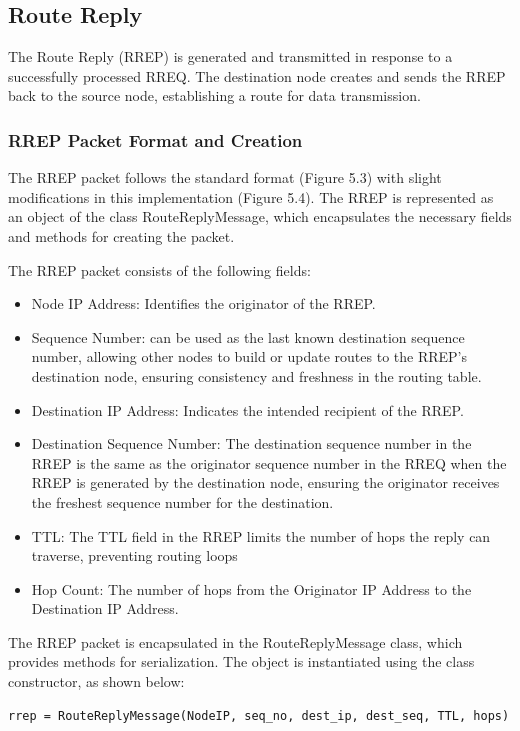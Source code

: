 \documentclass[]{nsm-thesis}
\begin{document}
\subsection{Route Reply}
The Route Reply (RREP) is generated and transmitted in response to a successfully processed RREQ. The destination node creates and sends the RREP back to the source node, establishing a route for data transmission.
\subsubsection{RREP Packet Format and Creation}
The RREP packet follows the standard format (Figure 5.3) with slight modifications in this implementation (Figure 5.4). The RREP is represented as an object of the class RouteReplyMessage, which encapsulates the necessary fields and methods for creating the packet.

The RREP packet consists of the following fields:
\begin{itemize}
    \item Node IP Address: Identifies the originator of the RREP.
    \item Sequence Number: can be used as the last known destination sequence number, allowing other nodes to build or update routes to the RREP's destination node, ensuring consistency and freshness in the routing table.
    \item Destination IP Address: Indicates the intended recipient of the RREP.
    \item Destination Sequence Number: The destination sequence number in the RREP is the same as the originator sequence number in the RREQ when the RREP is generated by the destination node, ensuring the originator receives the freshest sequence number for the destination.
    \item TTL: The TTL field in the RREP limits the number of hops the reply can traverse, preventing routing loops
    \item Hop Count: The number of hops from the Originator IP Address to the Destination IP Address.
\end{itemize}
The RREP packet is encapsulated in the RouteReplyMessage class, which provides methods for serialization. The object is instantiated using the class constructor, as shown below:

\lstset{
  basicstyle=\ttfamily\small,  %
  numbers=left,               %
  numberstyle=\tiny,          %
  stepnumber=1,               %
  numbersep=5pt,              %
  showstringspaces=false,     %
  frame=single,               %
  breaklines=true,            %
  captionpos=b,               %
  language=Python             %
}
\begin{lstlisting}[caption={RREQ Creation}, label={lst:example}]
rrep = RouteReplyMessage(NodeIP, seq_no, dest_ip, dest_seq, TTL, hops)

\end{lstlisting}
\end{document}
